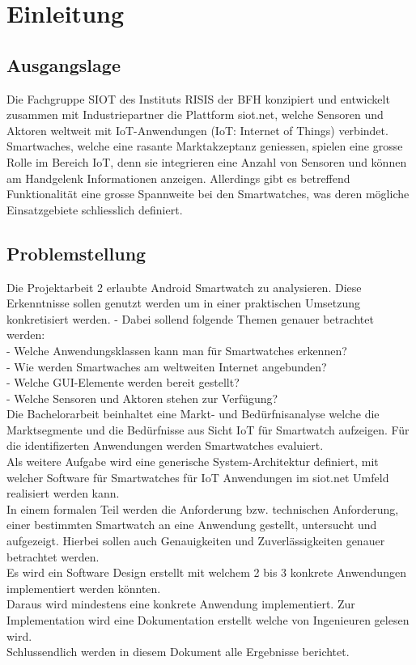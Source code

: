 \chapter{Einleitung}
\section{Ausgangslage}
Die Fachgruppe SIOT des Instituts RISIS der BFH konzipiert und entwickelt zusammen mit Industriepartner die Plattform siot.net, welche Sensoren und Aktoren weltweit mit IoT-Anwendungen (IoT: Internet of Things) verbindet. Smartwaches, welche eine rasante Marktakzeptanz geniessen, spielen eine grosse Rolle im Bereich IoT, denn sie integrieren eine Anzahl von Sensoren und können am Handgelenk Informationen anzeigen. Allerdings gibt es betreffend Funktionalität eine grosse Spannweite bei den Smartwatches, was deren mögliche Einsatzgebiete schliesslich definiert.

\section{Problemstellung}
Die Projektarbeit 2 erlaubte Android Smartwatch zu analysieren. Diese Erkenntnisse sollen genutzt werden um in einer praktischen Umsetzung konkretisiert werden.
- Dabei sollend folgende Themen genauer betrachtet werden: \\
- Welche Anwendungsklassen kann man für Smartwatches erkennen? \\
- Wie werden Smartwaches am weltweiten Internet angebunden? \\
- Welche GUI-Elemente werden bereit gestellt? \\
- Welche Sensoren und Aktoren stehen zur Verfügung? \\

Die Bachelorarbeit beinhaltet eine Markt- und Bedürfnisanalyse welche die Marktsegmente und die Bedürfnisse aus Sicht IoT für Smartwatch aufzeigen. Für die identifizerten Anwendungen werden Smartwatches evaluiert.\\
Als weitere Aufgabe wird eine generische System-Architektur definiert, mit welcher Software für Smartwatches für IoT Anwendungen im siot.net Umfeld realisiert werden kann. \\
In einem formalen Teil werden die Anforderung bzw. technischen Anforderung, einer bestimmten Smartwatch an eine Anwendung gestellt, untersucht und aufgezeigt. Hierbei sollen auch Genauigkeiten und Zuverlässigkeiten genauer betrachtet werden. \\
Es wird ein Software Design erstellt mit welchem 2 bis 3 konkrete Anwendungen implementiert werden könnten. \\
Daraus wird mindestens eine konkrete Anwendung implementiert. Zur Implementation wird eine Dokumentation erstellt welche von Ingenieuren gelesen wird. \\
Schlussendlich werden in diesem Dokument alle Ergebnisse berichtet.

